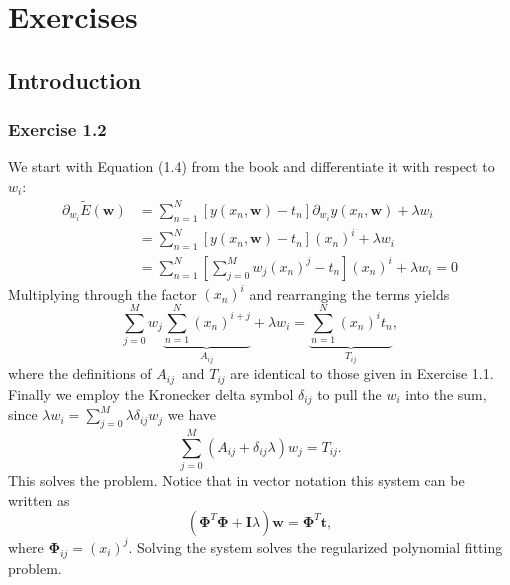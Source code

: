 \documentclass[12pt, a4paper]{article}
\newcommand{\vect}[1]{\bm{#1}}
\begin{document}
















\clearpage
\section{Exercises}

\subsection{Introduction}
\subsubsection*{Exercise 1.2}
We start with Equation (1.4) from the book and differentiate it with respect to $w_i$:
\begin{align*}
	\partial_{w_i} \tilde{E}(\vect{w})
	&= \sum_{n=1}^{N} \left[ y(x_n, \vect{w}) - t_n \right] \partial_{w_i} y(x_n, \vect{w}) + \lambda w_i \\
	&= \sum_{n=1}^{N} \left[ y(x_n, \vect{w}) - t_n \right] (x_n)^i + \lambda w_i \\
	&= \sum_{n=1}^{N} \left[ \sum_{j=0}^{M} w_j (x_n)^j - t_n \right] (x_n)^i + \lambda w_i = 0
\end{align*}
Multiplying through the factor $(x_n)^i$ and rearranging the terms yields
\begin{equation*}
	\sum_{j=0}^{M} w_j \underbrace{\sum_{n=1}^{N} (x_n)^{i+j}}_{A_{ij}}
	+
	\lambda w_i = \underbrace{\sum_{n=1}^{N}  (x_n)^i t_n}_{T_{ij}},
\end{equation*}
where the definitions of $A_{ij}$ and $T_{ij}$ are identical to those given in Exercise 1.1.
Finally we employ the Kronecker delta symbol $\delta_{ij}$ to pull the $w_i$ into the sum, since $\lambda w_i = \sum_{j=0}^{M} \lambda \delta_{ij} w_j$ we have
\begin{equation*}
	\sum_{j=0}^{M}  \left( A_{ij} + \delta_{ij} \lambda \right) w_j
	 = T_{ij}.
\end{equation*}
This solves the problem.
Notice that in vector notation this system can be written as 
\begin{equation*}
	\left( \vect{\Phi}^T \vect{\Phi} + \vect{I}\lambda \right) \vect{w} = \vect{\Phi}^T \vect{t},
\end{equation*}
where $\vect{\Phi}_{ij}= (x_i)^j$.
Solving the system solves the regularized polynomial fitting problem.
\end{document}
